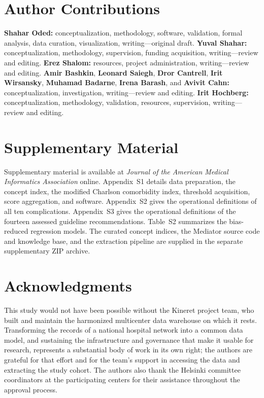 
\section*{Author Contributions}
\textbf{Shahar Oded:} conceptualization, methodology, software, validation,
formal analysis, data curation, visualization, writing---original draft.
\textbf{Yuval Shahar:} conceptualization, methodology, supervision, funding
acquisition, writing---review and editing.
\textbf{Erez Shalom:} resources, project administration, writing---review and
editing.
\textbf{Amir Bashkin}, \textbf{Leonard Saiegh}, \textbf{Dror Cantrell},
\textbf{Irit Wirsansky}, \textbf{Muhamad Badarne}, \textbf{Irena Barash}, and
\textbf{Avivit Cahn:} conceptualization, investigation, writing---review and
editing.
\textbf{Irit Hochberg:} conceptualization, methodology, validation,
resources, supervision, writing---review and editing.

\section*{Supplementary Material}
Supplementary material is available at \emph{Journal of the American Medical
Informatics Association} online. Appendix~S1 details data preparation, the
concept index, the modified Charlson comorbidity index, threshold
acquisition, score aggregation, and software. Appendix~S2 gives the
operational definitions of all ten complications. Appendix~S3 gives the
operational definitions of the fourteen assessed guideline recommendations.
Table~S2 summarizes the bias-reduced regression models. The curated concept
indices, the Mediator source code and knowledge base, and the extraction
pipeline are supplied in the separate supplementary ZIP archive.

\section*{Acknowledgments}
This study would not have been possible without the Kineret project team, who
built and maintain the harmonized multicenter data warehouse on which it
rests. Transforming the records of a national hospital network into a common
data model, and sustaining the infrastructure and governance that make it
usable for research, represents a substantial body of work in its own right;
the authors are grateful for that effort and for the team's support in
accessing the data and extracting the study cohort. The authors also thank
the Helsinki committee coordinators at the participating centers for their
assistance throughout the approval process.

